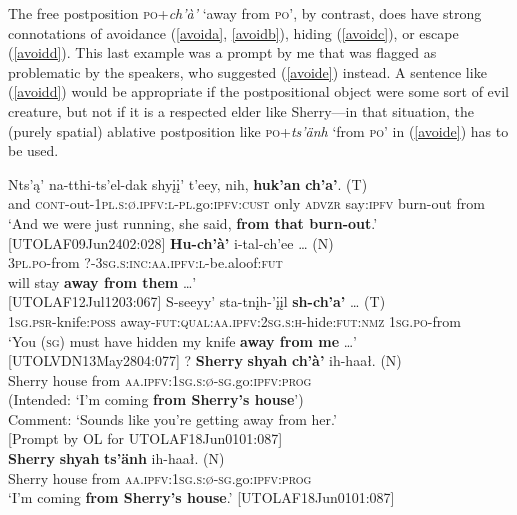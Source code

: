 \documentclass[output=paper,colorlinks,citecolor=brown]{langscibook}
\begin{document}
The free postposition \textsc{po}+\textit{ch'à'} `away from \textsc{po}', by contrast, does have strong connotations of avoidance (\ref{avoida}, \ref{avoidb}), hiding (\ref{avoidc}), or escape (\ref{avoidd}). This last example was a prompt by me that was flagged as problematic by the speakers, who suggested (\ref{avoide}) instead. A sentence like (\ref{avoidd}) would be appropriate if the postpositional object were some sort of evil creature, but not if it is a respected elder like Sherry—in that situation, the (purely spatial) ablative postposition like \textsc{po}+\textit{ts'änh} `from \textsc{po}' in (\ref{avoide}) has to be used. 

\begin{exe}
\ex 
\label{avoid}
\begin{xlista}
\ex\label{avoida}
\gll Nts'ą' na-tthi-ts'el-dak shyįį' t'eey, nih, \textbf{huk'an} \textbf{ch'a'}. \textnormal{(T)} \\
and \textsc{cont}-out-\textsc{1pl.s:ø.ipfv:l-pl}.go:\textsc{ipfv:cust} only \textsc{advzr} say:\textsc{ipfv} burn-out from \\
\glt `And we were just running, she said, \textbf{from that burn-out}.' \\ \hfill [UTOLAF09Jun2402:028] 
\ex \label{avoidb}
\gll \textbf{Hu-ch'à'} {i-tal-ch'ee {\ldots} \textnormal{(N)}} \\
\textsc{3pl.po}-from \textsc{?-3sg.s:inc:aa.ipfv:l}-be.aloof:\textsc{fut} \\
 will stay \textbf{away from them} \ldots' \\ \hfill [UTOLAF12Jul1203:067]
\ex \label{avoidc}
\gll S-seeyy' sta-tnįh-'įįl {\textbf{sh-ch'a'} {\ldots} \textnormal{(T)}} \\
\textsc{1sg.psr}-knife:\textsc{poss} away-\textsc{fut:qual:aa.ipfv:2sg.s:h}-hide:\textsc{fut:nmz} \textsc{1sg.po}-from \\
\glt `You (\textsc{sg}) must have hidden my knife \textbf{away from me} \ldots' \\ \hfill [UTOLVDN13May2804:077]
\ex \label{avoidd}
\gll ? \textbf{Sherry} \textbf{shyah} \textbf{ch'à'} {ih-haał. \textnormal{(N)}} \\
{} Sherry house from \textsc{aa.ipfv:1sg.s:ø-sg}.go:\textsc{ipfv:prog} \\
\glt (Intended: `I'm coming \textbf{from Sherry's house}') \\ Comment: `Sounds like you're getting away from her.' \\ \hfill [Prompt by OL for UTOLAF18Jun0101:087]\\
\ex \label{avoide}
\gll \textbf{Sherry} \textbf{shyah} \textbf{ts'änh} {ih-haał. \textnormal{(N)}} \\
Sherry house from \textsc{aa.ipfv:1sg.s:ø-sg}.go:\textsc{ipfv:prog} \\
\glt `I'm coming \textbf{from Sherry's house}.' \hfill [UTOLAF18Jun0101:087]
\end{xlista}
\end{exe}
\end{document}
